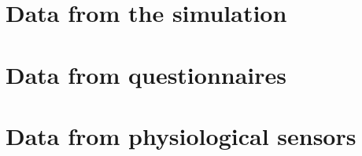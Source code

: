 \section{Data from the simulation}



\section{Data from questionnaires}



\section{Data from physiological sensors}

